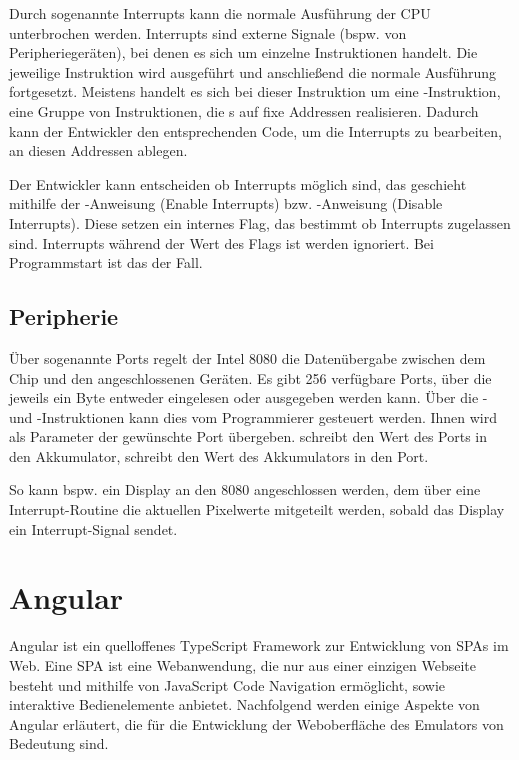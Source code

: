 Durch sogenannte Interrupts kann die normale Ausführung der \ac{CPU} unterbrochen werden. Interrupts sind externe Signale (bspw. von Peripheriegeräten), bei denen es sich um einzelne Instruktionen handelt. Die jeweilige Instruktion wird ausgeführt und anschließend die normale Ausführung fortgesetzt. Meistens handelt es sich bei dieser Instruktion um eine -Instruktion, eine Gruppe von Instruktionen, die s auf fixe Addressen realisieren. Dadurch kann der Entwickler den entsprechenden Code, um die Interrupts zu bearbeiten, an diesen Addressen ablegen.

Der Entwickler kann entscheiden ob Interrupts möglich sind, das geschieht mithilfe der -Anweisung (Enable Interrupts) bzw. -Anweisung (Disable Interrupts). Diese setzen ein internes Flag, das bestimmt ob Interrupts zugelassen sind. Interrupts während der Wert des Flags  ist werden ignoriert. Bei Programmstart ist das der Fall.

\subsection{Peripherie}

Über sogenannte Ports regelt der Intel 8080 die Datenübergabe zwischen dem Chip und den angeschlossenen Geräten. 
Es gibt 256 verfügbare Ports, über die jeweils ein Byte entweder eingelesen oder ausgegeben werden kann. Über die - und -Instruktionen kann dies vom Programmierer gesteuert werden. Ihnen wird als Parameter der gewünschte Port übergeben.  schreibt den Wert des Ports in den Akkumulator,  schreibt den Wert des Akkumulators in den Port.

So kann bspw. ein Display an den 8080 angeschlossen werden, dem über eine Interrupt-Routine die aktuellen Pixelwerte mitgeteilt werden, sobald das Display ein Interrupt-Signal sendet.

\section{Angular}

Angular ist ein quelloffenes TypeScript Framework zur Entwicklung von \acp{SPA} im Web. Eine \ac{SPA} ist eine Webanwendung, die nur aus einer einzigen Webseite besteht und mithilfe von JavaScript Code Navigation ermöglicht, sowie interaktive Bedienelemente anbietet. Nachfolgend werden einige Aspekte von Angular erläutert, die für die Entwicklung der Weboberfläche des Emulators von Bedeutung sind.

